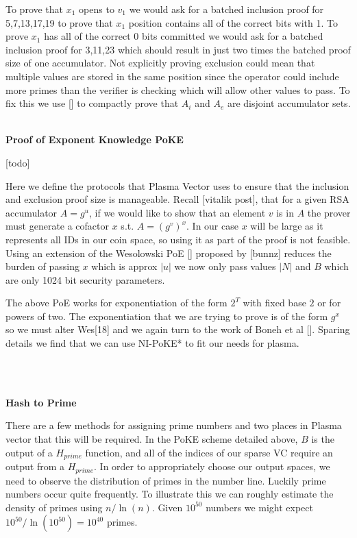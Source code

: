 \documentclass[11pt]{article}
\begin{document}
To prove that $x_1$ opens to $v_1$ we would ask for a batched inclusion proof for 5,7,13,17,19 to prove that $x_1$ position contains all of the correct bits with 1. To prove $x_1$ has all of the correct 0 bits committed we would ask for a batched inclusion proof for 3,11,23 which should result in just two times the batched proof size of one accumulator. Not explicitly proving exclusion could mean that multiple values are stored in the same position since the operator could include more primes than the verifier is checking which will allow other values to pass. To fix this we use [] to compactly prove that $A_i$ and $A_e$ are disjoint accumulator sets.
\\
\\

\centerline{\textbf{Proof of Exponent Knowledge \textbf{PoKE}}}

[todo]

Here we define the protocols that Plasma Vector uses to ensure that the inclusion and exclusion proof size is manageable. Recall [vitalik post], that for a given RSA accumulator $A = g^u$, if we would like to show that an element $v$ is in $A$ the prover must generate a cofactor $x$ s.t. $A = (g^v)^x$. In our case $x$ will be large as it represents all IDs in our coin space, so using it as part of the proof is not feasible. Using an extension of the Wesolowski PoE [] proposed by [bunnz] reduces the burden of passing $x$ which is approx $|u|$ we now only pass values $|N|$ and $B$ which are only 1024 bit security parameters.

The above PoE works for exponentiation of the form $2^T$ with fixed base $2$ or for powers of two. The exponentiation that we are trying to prove is of the form $g^x$ so we must alter Wes[18] and we again turn to the work of Boneh et al []. Sparing details we find that we can use NI-PoKE* to fit our needs for plasma. 

\\ 
\\

\centerline{\textbf{Hash to Prime}}

There are a few methods for assigning prime numbers and two places in Plasma vector that this will be required. In the PoKE scheme detailed above, $B$ is the output of a $H_{prime}$ function, and all of the indices of our sparse VC require an output from a $H_{prime}$. In order to appropriately choose our output spaces, we need to observe the distribution of primes in the number line. Luckily prime numbers occur quite frequently. To illustrate this we can roughly estimate the density of primes using $n/\ln(n)$. Given $10^{50}$ numbers we might expect $10^{50}/\ln(10^{50})=10^{40} $ primes.
\end{document}
